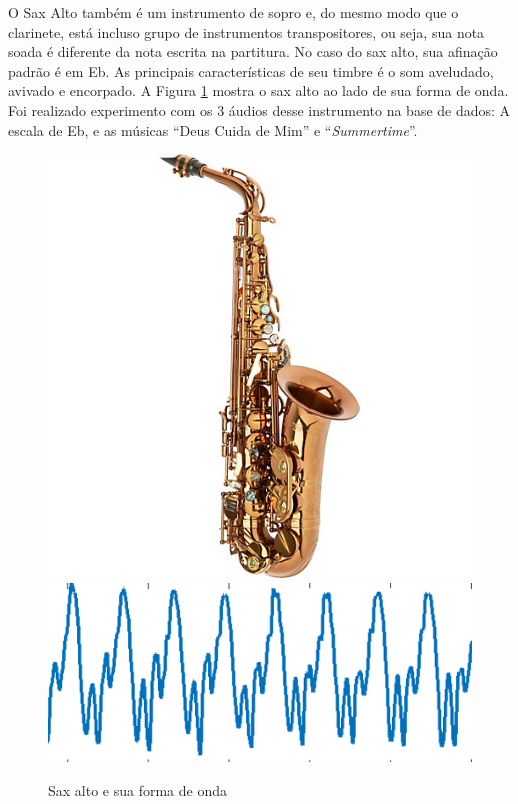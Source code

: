 O Sax Alto também é um instrumento de sopro e, do mesmo modo que o clarinete, está incluso grupo de instrumentos transpositores, ou seja, sua nota soada é diferente da nota escrita na partitura. No caso do sax alto, sua afinação padrão é em Eb. As principais características de seu timbre é o som aveludado, avivado e encorpado. A Figura \ref{fig-sax} mostra o sax alto ao lado de sua forma de onda. Foi realizado experimento com os 3 áudios desse instrumento na base de dados: A escala de Eb, e as músicas ``Deus Cuida de Mim'' e ``\textit{Summertime}''.

\begin{figure}[h!]
	\centering
	\includegraphics[width=\linewidth/4]{pasta1_figuras/sax.jpg}
	\includegraphics[scale=0.8]{pasta1_figuras/sax-timbre.png}
	\caption{Sax alto e sua forma de onda}
	\label{fig-sax}
\end{figure}

